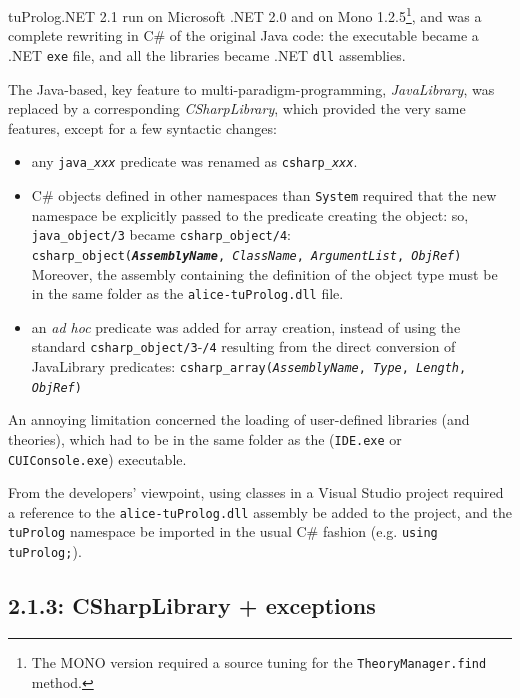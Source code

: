 tuProlog.NET 2.1 run on Microsoft .NET 2.0 and on Mono 1.2.5\footnote{The MONO version required a source tuning for the \texttt{TheoryManager.find} method.}, and was a complete rewriting in C\# of the original Java code: the executable became a .NET \texttt{exe} file, and all the libraries became .NET \texttt{dll} assemblies.

The Java-based, key feature to multi-paradigm-programming, \textit{JavaLibrary}, was replaced by a corresponding \textit{CSharpLibrary}, which provided the very same features, except for a few syntactic changes:
\begin{itemize}
  \item any \texttt{java\_\textit{xxx}} predicate was renamed as \texttt{csharp\_\textit{xxx}}.

  \item C\# objects defined in other namespaces than \texttt{System} required that the new namespace be explicitly passed to the predicate creating the object: so, \texttt{java\_object/3} became \texttt{csharp\_object/4}:\\
        \texttt{csharp\_object(\textit{\textbf{AssemblyName}}, \textit{ClassName}, \textit{ArgumentList}, \textit{ObjRef})}\\
      Moreover, the assembly containing the definition of the object type must be in the same folder as the \texttt{alice-tuProlog.dll} file.

\item an \textit{ad hoc} predicate was added for array creation, instead of using the standard \texttt{csharp\_object/3}-\texttt{/4} resulting from the direct conversion of JavaLibrary predicates:
    \texttt{csharp\_array(\textit{AssemblyName}, \textit{Type}, \textit{Length}, \textit{ObjRef})}
\end{itemize}

An annoying limitation concerned the loading of user-defined libraries (and theories), which had to be in the same folder as the \tuprolog{} (\texttt{IDE.exe} or \texttt{CUIConsole.exe}) executable.

From the developers' viewpoint, using \tuprolog{} classes in a Visual Studio project required a reference to the \texttt{alice-tuProlog.dll} assembly be added to the project, and the \texttt{tuProlog} namespace be imported in the usual C\# fashion (e.g. \texttt{using tuProlog;}).

\subsection{\tuprolog{} 2.1.3: CSharpLibrary + exceptions}
\label{ssec:dotnet-tuprolog2.1.3}


